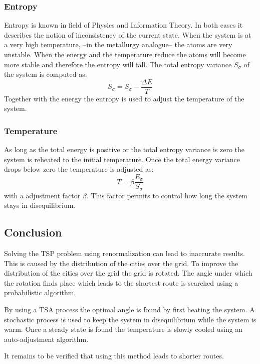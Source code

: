 \subsubsection{Entropy}
Entropy is known in field of Physics and Information Theory. In both cases it
describes the notion of inconsistency of the current state. When the system is
at a very high temperature, --in the metallurgy analogue-- the atoms are very
unstable. When the energy and the temperature reduce the atoms will become
more stable and therefore the entropy will fall. The total entropy variance
$S_\sigma$ of the system is computed as:
\begin{equation}\label{eq:entropy}
S_\sigma = S_\sigma - \frac{\Delta E}{T}
\end{equation}
Together with the energy the entropy is used to adjust the temperature of the
system.

\subsubsection{Temperature}\label{sec:temp}
As long as the total energy is positive or the total entropy variance is zero
the system is reheated to the initial temperature. Once the total energy
variance drops below zero the temperature is adjusted as:
\begin{equation}\label{eq:tempadj}
T = \beta\frac{E_\sigma}{S_\sigma}
\end{equation}
with a adjustment factor $\beta$. This factor permits to control how long the
system stays in disequilibrium. 

\subsection{Conclusion}
Solving the TSP problem using renormalization can lead to inaccurate results. This is
caused by the distribution of the cities over the grid. To improve the
distribution of the cities over the grid the grid is rotated. The angle under
which the rotation finds place which leads to the shortest route is searched
using a probabilistic algorithm. 

By using a TSA process the optimal angle is found by first
heating the system. A stochastic process is used to keep the system in
disequilibrium while the system is warm. Once a steady state is found the
temperature is slowly cooled using an auto-adjustment algorithm.

It remains to be verified that using this method leads to shorter routes.


